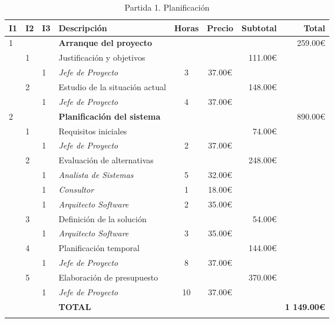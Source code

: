 \begin{longtable}{ l l l l c c r r }
    \hline
    I1 & I2 & I3 & Descripción & Horas & Precio & Subtotal & Total \\
    \hline
    1 & & & \textbf{Arranque del proyecto}      & & & & 259.00€ \\
    & 1 & & Justificación y objetivos           & & & 111.00€   & \\
    & & 1 & \emph{Jefe de Proyecto}             & 3 & 37.00€ &  & \\
    & 2 & & Estudio de la situación actual      & & & 148.00€   & \\
    & & 1 & \emph{Jefe de Proyecto}             & 4 & 37.00€ &  & \\
    2 & & & \textbf{Planificación del sistema}  & & & & 890.00€ \\
    & 1 & & Requisitos iniciales                & & & 74.00€    & \\
    & & 1 & \emph{Jefe de Proyecto}             & 2 & 37.00€ &  & \\
    & 2 & & Evaluación de alternativas          & & & 248.00€   & \\
    & & 1 & \emph{Analista de Sistemas}         & 5 & 32.00€ &  & \\
    & & 1 & \emph{Consultor}                    & 1 & 18.00€ &  & \\
    & & 1 & \emph{Arquitecto Software}          & 2 & 35.00€ &  & \\
    & 3 & & Definición de la solución           & & & 54.00€    & \\
    & & 1 & \emph{Arquitecto Software}          & 3 & 35.00€ &  & \\
    & 4 & & Planificación temporal              & & & 144.00€   & \\
    & & 1 & \emph{Jefe de Proyecto}             & 8 & 37.00€ &  & \\
    & 5 & & Elaboración de presupuesto          & & & 370.00€   & \\
    & & 1 & \emph{Jefe de Proyecto}             & 10 & 37.00€ &  & \\
    \hline
    & & & \textbf{TOTAL}                        & & & & \textbf{1 149.00€} \\
    \hline
    \caption{Partida 1. Planificación}
    \label{pre:planificacion}
\end{longtable}


